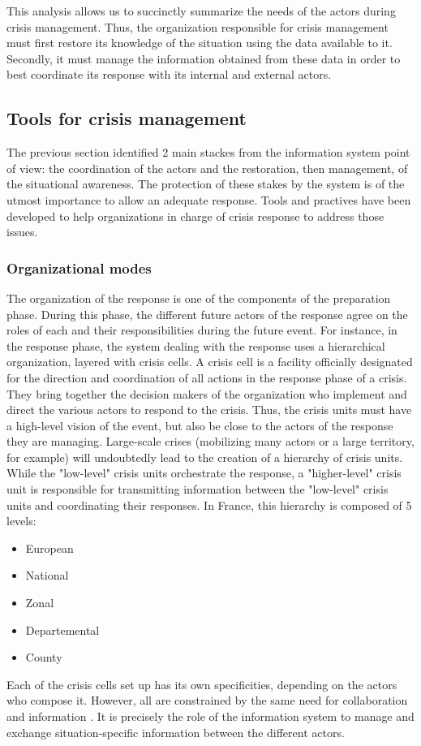 This analysis allows us to succinctly summarize the needs of the actors during crisis management.
Thus, the organization responsible for crisis management must first restore its knowledge of the situation using the data available to it.
Secondly, it must manage the information obtained from these data in order to best coordinate its response with its internal and external actors.

\subsection{Tools for crisis management}
The previous section identified 2 main stackes from the information system point of view: the coordination of the actors and the restoration, then management, of the situational awareness.
The protection of these stakes by the system is of the utmost importance to allow an adequate response.
Tools and practives have been developed to help organizations in charge of crisis response to address those issues.

\subsubsection{Organizational modes}
The organization of the response is one of the components of the preparation phase.
During this phase, the different future actors of the response agree on the roles of each and their responsibilities during the future event.
For instance, in the response phase, the system dealing with the response uses a hierarchical organization, layered with crisis cells.
A crisis cell is a facility officially designated for the direction and coordination of all actions in the response phase of a crisis.
They bring together the decision makers of the organization who implement and direct the various actors to respond to the crisis.
Thus, the crisis units must have a high-level vision of the event, but also be close to the actors of the response they are managing.
Large-scale crises (mobilizing many actors or a large territory, for example) will undoubtedly lead to the creation of a hierarchy of crisis units.
While the "low-level" crisis units orchestrate the response, a "higher-level" crisis unit is responsible for transmitting information between the "low-level" crisis units and coordinating their responses.
In France, this hierarchy is composed of 5 levels:
\begin{itemize}
    \item European
    \item National
    \item Zonal
    \item Departemental
    \item County
\end{itemize}
Each of the crisis cells set up has its own specificities, depending on the actors who compose it.
However, all are constrained by the same need for collaboration \cite{benabenAIFrameworkMetamodel2020,comfortCrisisManagementHindsight2007} and information \cite{comfortCrisisManagementHindsight2007,endsleyTheorySituationAwareness1995}.
It is precisely the role of the information system to manage and exchange situation-specific information between the different actors.


